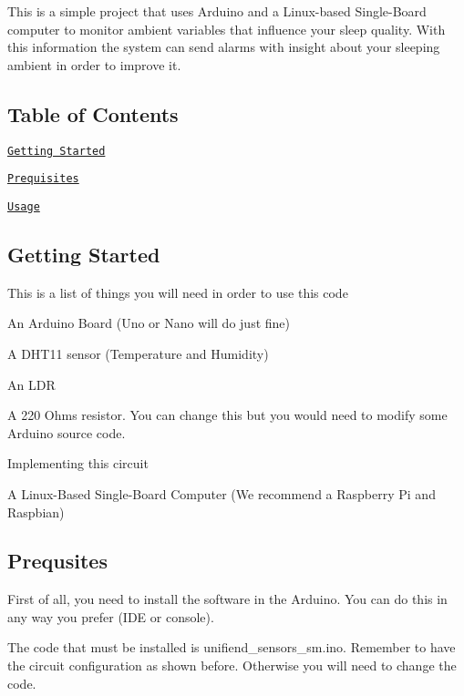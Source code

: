 This is a simple project that uses Arduino and a Linux-\/based Single-\/\+Board computer to monitor ambient variables that influence your sleep quality. With this information the system can send alarms with insight about your sleeping ambient in order to improve it.

\subsection*{Table of Contents}


\begin{DoxyItemize}
\item \href{#getting-started}{\tt Getting Started}
\item \href{#prequsites}{\tt Prequisites}
\item \href{#usage}{\tt Usage}
\end{DoxyItemize}

\subsection*{Getting Started}

This is a list of things you will need in order to use this code
\begin{DoxyItemize}
\item An Arduino Board (Uno or Nano will do just fine)
\begin{DoxyItemize}
\item A D\+H\+T11 sensor (Temperature and Humidity)
\item An L\+DR
\item A 220 Ohms resistor. You can change this but you would need to modify some Arduino source code.
\item Implementing this circuit 
\end{DoxyItemize}
\item A Linux-\/\+Based Single-\/\+Board Computer (We recommend a Raspberry Pi and Raspbian) \subsection*{Prequsites}
\end{DoxyItemize}

First of all, you need to install the software in the Arduino. You can do this in any way you prefer (I\+DE or console).

The code that must be installed is {\ttfamily unifiend\+\_\+sensors\+\_\+sm.\+ino}. Remember to have the circuit configuration as shown before. Otherwise you will need to change the code.

